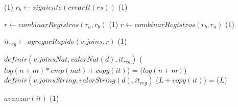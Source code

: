 {        \State
                                                \comment \bigo(1)
            \State $r_b \gets siguiente(crearIt(rs))$               \comment \bigo(1)

            \State
                \State $r \gets combinarRegistros(r_a, r_b)$        \comment \bigo(1)
            \Else
                \State $r \gets combinarRegistros(r_b, r_a)$        \comment \bigo(1)
            \EndIf

            \State $it_{reg} \gets agregarRapido(v.joins, r)$       \comment \bigo(1)

            \State
                \State $definir(v.joinsNat, valorNat(d), it_{reg})$         \comment \bigo($log(n+m) * cmp(nat) + copy(it)$) = \bigo($log(n+m)$)
            \Else
                \State $definir(v.joinsString, valorString(d), it_{reg})$   \comment \bigo($L + copy(it)$) = \bigo($L$)
            \EndIf
        \EndIf

        \State $avanzar(it)$                                        \comment \bigo(1)
    \EndWhile

}{}
